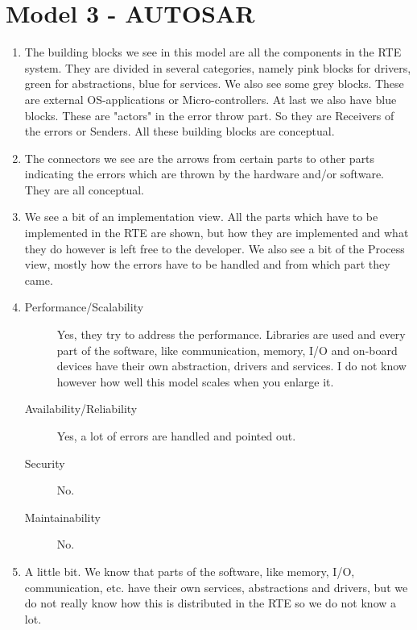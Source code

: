 \section{Model 3 - AUTOSAR}
\begin{enumerate}
	\item The building blocks we see in this model are all the components in the RTE system.
	They are divided in several categories, namely pink blocks for drivers, green for abstractions, blue for services. 
	We also see some grey blocks. 
	These are external OS-applications or Micro-controllers.
	At last we also have blue blocks.
	These are "actors" in the error throw part.
	So they are Receivers of the errors or Senders.
	All these building blocks are conceptual.
	
	\item The connectors we see are the arrows from certain parts to other parts indicating the errors which are thrown by the hardware and/or software.
	They are all conceptual.
	
	\item We see a bit of an implementation view. 
	All the parts which have to be implemented in the RTE are shown, but how they are implemented and what they do however is left free to the developer.
	We also see a bit of the Process view, mostly how the errors have to be handled and from which part they came.
	
	\item 
	\begin{description}
		\item[Performance/Scalability] Yes, they try to address the performance. 
		Libraries are used and every part of the software, like communication, memory, I/O and on-board devices have their own abstraction, drivers and services.
		I do not know however how well this model scales when you enlarge it.
		\item[Availability/Reliability] Yes, a lot of errors are handled and pointed out.
		\item[Security] No.
		\item[Maintainability] No.
	\end{description}
	
	\item A little bit. 
	We know that parts of the software, like memory, I/O, communication, etc. have their own services, abstractions and drivers, but we do not really know how this is distributed in the RTE so we do not know a lot. 
	

\end{enumerate}
